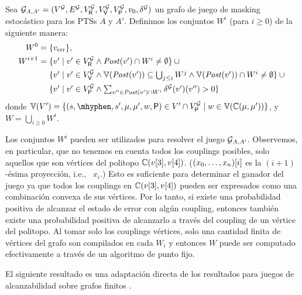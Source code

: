 \begin{definition}\label{def:W}
  Sea
  $\StochG_{A,A'} = (V^\StochG, E^\StochG, V^\StochG_\Refuter, V^\StochG_\Verifier, V^\StochG_\Probabilistic, \InitVertex, \delta^\StochG)$
  un grafo de juego de masking estocástico para los PTSs $A$ y $A'$.
  Definimos los conjuntos $W^i$ (para $i \geq 0$) de la siguiente manera:
  {\footnotesize%
  \begin{align*}
    W^0= {} & \{\ErrorSt\}, \\
    W^{i+1} = {}
    & \textstyle
      \{v' \mid v' \in V^\StochG_\Refuter \wedge \post(v') \cap W^i \neq \emptyset \} \cup {} \\
    & \textstyle
      \{v' \mid {v' \in V^\StochG_\Verifier} \wedge  {\vertices{\post(v')} \subseteq  \bigcup_{j \leq i}W^{j}} \wedge {\vertices{\post(v')} \cap W^i \neq \emptyset} \} \cup {} \\
    & \textstyle
      \{v' \mid v' \in V^\StochG_\Probabilistic \wedge \sum_{v'' \in \post(v') \cap W^i} \delta^\StochG(v')(v'') > 0 \}
  \end{align*}
  }%
  donde
  $\vertices{V'}= \{ (s, \mhyphen, s', \mu, \mu', w, \Probabilistic) \in V' \cap V^\StochG_\Probabilistic \mid w \in \vertices{\couplings{\mu}{\mu'}}\}$, y
  $W = \bigcup_{i  \geq 0} W^i$.
\end{definition}
%
Los conjuntos $W^i$ pueden ser utilizados para resolver el juego $\StochG_{A,A'}$.
Observemos, en particular, que no tenemos en cuenta todos los couplings posibles, solo aquellos que son vértices del politopo
$\couplings{\pr{3}{v}}{\pr{4}{v}}$. ($\pr{i}{(x_0,\dots,x_n)}$ es la $(i+1)$-ésima proyección, i.e., \ $x_i$.)
%
Esto es suficiente para determinar el ganador del juego ya que todos los couplings en $\couplings{\pr{3}{v}}{\pr{4}{v}}$ pueden ser expresados como una combinación convexa de sus vértices.  Por lo tanto, si existe una probabilidad positiva de alcanzar el estado de error con algún coupling, entonces también existe una probabilidad positiva de alcanzarlo a través del coupling de un vértice del politopo.
%
Al tomar solo los couplings vértices, solo una cantidad finita de vértices del grafo son compilados en cada $W_i$ y entonces $W$ puede ser computado efectivamente a través de un algoritmo de punto fijo.

El siguiente resultado es una adaptación directa de los resultados para juegos de alcanzabilidad sobre grafos finitos \cite{ChatterjeeH12}.
	
